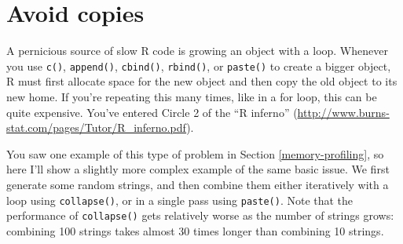 \documentclass[]{book}
\makeatletter
\newcommand{\indexc}[1]{\index{#1@\texttt{#1}}}
\renewcommand{\href}[2]{#2 (\url{#1})}
\makeatother
\begin{document}
\hypertarget{avoid-copies}{%
\section{Avoid copies}\label{avoid-copies}}

\indexc{paste()}

A pernicious source of slow R code is growing an object with a loop. Whenever you use \texttt{c()}, \texttt{append()}, \texttt{cbind()}, \texttt{rbind()}, or \texttt{paste()} to create a bigger object, R must first allocate space for the new object and then copy the old object to its new home. If you're repeating this many times, like in a for loop, this can be quite expensive. You've entered Circle 2 of the \href{http://www.burns-stat.com/pages/Tutor/R_inferno.pdf}{``R inferno''}.

You saw one example of this type of problem in Section \ref{memory-profiling}, so here I'll show a slightly more complex example of the same basic issue. We first generate some random strings, and then combine them either iteratively with a loop using \texttt{collapse()}, or in a single pass using \texttt{paste()}. Note that the performance of \texttt{collapse()} gets relatively worse as the number of strings grows: combining 100 strings takes almost 30 times longer than combining 10 strings.
\end{document}
